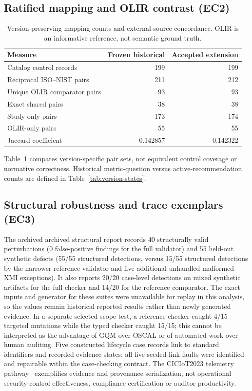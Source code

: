 \documentclass[12pt,a4paper]{article}
\begin{document}
\subsection{Ratified mapping and OLIR contrast (EC2)}
\begin{table}[tbp]\centering\small
\caption{Version-preserving mapping counts and external-source concordance. OLIR is an informative reference, not semantic ground truth.}\label{tab:olir}
\begin{tabular}{@{}lrr@{}}\toprule
Measure & Frozen historical & Accepted extension \\\midrule
Catalog control records & 199 & 199 \\
Reciprocal ISO--NIST pairs & 211 & 212 \\
Unique OLIR comparator pairs & 93 & 93 \\
Exact shared pairs & 38 & 38 \\
Study-only pairs & 173 & 174 \\
OLIR-only pairs & 55 & 55 \\
Jaccard coefficient & 0.142857 & 0.142322 \\
\bottomrule\end{tabular}\end{table}

Table~\ref{tab:olir} compares version-specific pair sets, not equivalent control coverage or normative correctness. Historical metric-question versus active-recommendation counts are defined in Table~\ref{tab:version-states}.

\subsection{Structural robustness and trace exemplars (EC3)}
The archived archived structural report records 40 structurally valid perturbations (0 false-positive findings for the full validator) and 55 held-out synthetic defects (55/55 structured detections, versus 15/55 structured detections by the narrower reference validator and five additional unhandled malformed-XMI exceptions). It also reports 20/20 case-level detections on mixed synthetic artifacts for the full checker and 14/20 for the reference comparator. The exact inputs and generator for these suites were unavailable for replay in this analysis, so the values remain historical reported results rather than newly generated evidence. In a separate selected scope test, a reference checker caught 4/15 targeted mutations while the typed checker caught 15/15; this cannot be interpreted as the advantage of GQM over OSCAL or of automated work over human auditing. Five constructed lifecycle case records link to standard identifiers and recorded evidence states; all five seeded link faults were identified and repairable within the case-checking contract. The CICIoT2023 telemetry pathway~\cite{Neto2023_CICIoT2023,CICIoT2023_Web} exemplifies evidence and provenance serialization, not operational security-control effectiveness, compliance certification or auditor productivity.
\end{document}
